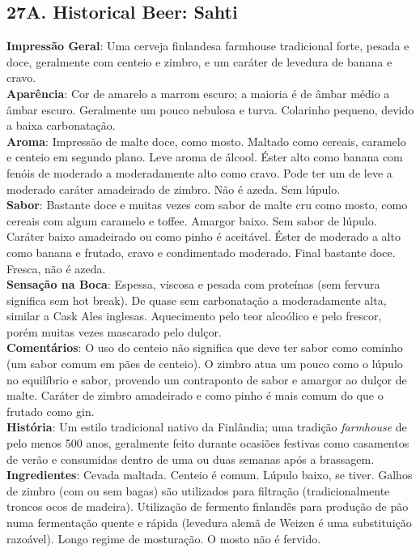 \subsection*{27A. Historical Beer: Sahti}
\textbf{Impressão Geral}: Uma cerveja finlandesa farmhouse tradicional forte, pesada e doce, geralmente com centeio e zimbro, e um caráter de levedura de banana e cravo. \\
\textbf{Aparência}: Cor de amarelo a marrom escuro; a maioria é de âmbar médio a âmbar escuro. Geralmente um pouco nebulosa e turva. Colarinho pequeno, devido a baixa carbonatação. \\
\textbf{Aroma}: Impressão de malte doce, como mosto. Maltado como cereais, caramelo e centeio em segundo plano. Leve aroma de álcool. Éster alto como banana com fenóis de moderado a moderadamente alto como cravo. Pode ter um de leve a moderado caráter amadeirado de zimbro. Não é azeda. Sem lúpulo. \\
\textbf{Sabor}: Bastante doce e muitas vezes com sabor de malte cru como mosto, como cereais com algum caramelo e toffee. Amargor baixo. Sem sabor de lúpulo. Caráter baixo amadeirado ou como pinho é aceitável. Éster de moderado a alto como banana e frutado, cravo e condimentado moderado. Final bastante doce. Fresca, não é azeda. \\
\textbf{Sensação na Boca}: Espessa, viscosa e pesada com proteínas (sem fervura significa sem hot break). De quase sem carbonatação a moderadamente alta, similar a Cask Ales inglesas. Aquecimento pelo teor alcoólico e pelo frescor, porém muitas vezes mascarado pelo dulçor. \\
\textbf{Comentários}: O uso do centeio não significa que deve ter sabor como cominho (um sabor comum em pães de centeio). O zimbro atua um pouco como o lúpulo no equilíbrio e sabor, provendo um contraponto de sabor e amargor ao dulçor de malte. Caráter de zimbro amadeirado e como pinho é mais comum do que o frutado como gin. \\
\textbf{História}: Um estilo tradicional nativo da Finlândia; uma tradição \textit{farmhouse} de pelo menos 500 anos, geralmente feito durante ocasiões festivas como casamentos de verão e consumidas dentro de uma ou duas semanas após a brassagem. \\
\textbf{Ingredientes}: Cevada maltada. Centeio é comum. Lúpulo baixo, se tiver. Galhos de zimbro (com ou sem bagas) são utilizados para filtração (tradicionalmente troncos ocos de madeira). Utilização de fermento finlandês para produção de pão numa fermentação quente e rápida (levedura alemã de Weizen é uma substituição razoável). Longo regime de mosturação. O mosto não é fervido. \\
